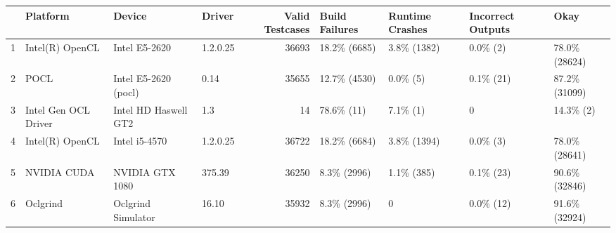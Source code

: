 \begin{tabular}{llllrllll}
\toprule
{} &              Platform &                Device &    Driver &  Valid Testcases & Build Failures & Runtime Crashes & Incorrect Outputs &           Okay \\
\midrule
1 &       Intel(R) OpenCL &         Intel E5-2620 &  1.2.0.25 &            36693 &   18.2\% (6685) &     3.8\% (1382) &          0.0\% (2) &  78.0\% (28624) \\
2 &                  POCL &  Intel E5-2620 (pocl) &      0.14 &            35655 &   12.7\% (4530) &        0.0\% (5) &         0.1\% (21) &  87.2\% (31099) \\
3 &  Intel Gen OCL Driver &  Intel HD Haswell GT2 &       1.3 &               14 &     78.6\% (11) &        7.1\% (1) &                 0 &      14.3\% (2) \\
4 &       Intel(R) OpenCL &         Intel i5-4570 &  1.2.0.25 &            36722 &   18.2\% (6684) &     3.8\% (1394) &          0.0\% (3) &  78.0\% (28641) \\
5 &           NVIDIA CUDA &       NVIDIA GTX 1080 &    375.39 &            36250 &    8.3\% (2996) &      1.1\% (385) &         0.1\% (23) &  90.6\% (32846) \\
6 &              Oclgrind &    Oclgrind Simulator &     16.10 &            35932 &    8.3\% (2996) &               0 &         0.0\% (12) &  91.6\% (32924) \\
\bottomrule
\end{tabular}
